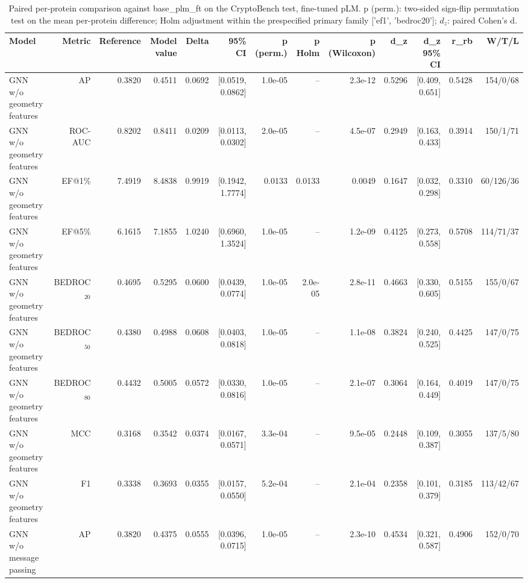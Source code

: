 \begin{table}[t]
\centering
\small
\caption{Paired per-protein comparison against base_plm_ft on the CryptoBench test, fine-tuned pLM. p (perm.): two-sided sign-flip permutation test on the mean per-protein difference; Holm adjustment within the prespecified primary family ['ef1', 'bedroc20']; $d_z$: paired Cohen's d.}
\label{tab:table_paired_vs_base_plm_ft}
\begin{tabular}{lrrrrrrrrrrrr}
\toprule
Model & Metric & Reference & Model value & Delta & 95\% CI & p (perm.) & p Holm & p (Wilcoxon) & d\_z & d\_z 95\% CI & r\_rb & W/T/L \\
\midrule
GNN w/o geometry features & AP & 0.3820 & 0.4511 & 0.0692 & [0.0519, 0.0862] & 1.0e-05 & -- & 2.3e-12 & 0.5296 & [0.409, 0.651] & 0.5428 & 154/0/68 \\
GNN w/o geometry features & ROC-AUC & 0.8202 & 0.8411 & 0.0209 & [0.0113, 0.0302] & 2.0e-05 & -- & 4.5e-07 & 0.2949 & [0.163, 0.433] & 0.3914 & 150/1/71 \\
GNN w/o geometry features & EF@1\% & 7.4919 & 8.4838 & 0.9919 & [0.1942, 1.7774] & 0.0133 & 0.0133 & 0.0049 & 0.1647 & [0.032, 0.298] & 0.3310 & 60/126/36 \\
GNN w/o geometry features & EF@5\% & 6.1615 & 7.1855 & 1.0240 & [0.6960, 1.3524] & 1.0e-05 & -- & 1.2e-09 & 0.4125 & [0.273, 0.558] & 0.5708 & 114/71/37 \\
GNN w/o geometry features & BEDROC$_{20}$ & 0.4695 & 0.5295 & 0.0600 & [0.0439, 0.0774] & 1.0e-05 & 2.0e-05 & 2.8e-11 & 0.4663 & [0.330, 0.605] & 0.5155 & 155/0/67 \\
GNN w/o geometry features & BEDROC$_{50}$ & 0.4380 & 0.4988 & 0.0608 & [0.0403, 0.0818] & 1.0e-05 & -- & 1.1e-08 & 0.3824 & [0.240, 0.525] & 0.4425 & 147/0/75 \\
GNN w/o geometry features & BEDROC$_{80}$ & 0.4432 & 0.5005 & 0.0572 & [0.0330, 0.0816] & 1.0e-05 & -- & 2.1e-07 & 0.3064 & [0.164, 0.449] & 0.4019 & 147/0/75 \\
GNN w/o geometry features & MCC & 0.3168 & 0.3542 & 0.0374 & [0.0167, 0.0571] & 3.3e-04 & -- & 9.5e-05 & 0.2448 & [0.109, 0.387] & 0.3055 & 137/5/80 \\
GNN w/o geometry features & F1 & 0.3338 & 0.3693 & 0.0355 & [0.0157, 0.0550] & 5.2e-04 & -- & 2.1e-04 & 0.2358 & [0.101, 0.379] & 0.3185 & 113/42/67 \\
GNN w/o message passing & AP & 0.3820 & 0.4375 & 0.0555 & [0.0396, 0.0715] & 1.0e-05 & -- & 2.3e-10 & 0.4534 & [0.321, 0.587] & 0.4906 & 152/0/70 \\

\end{tabular}
\end{table}
